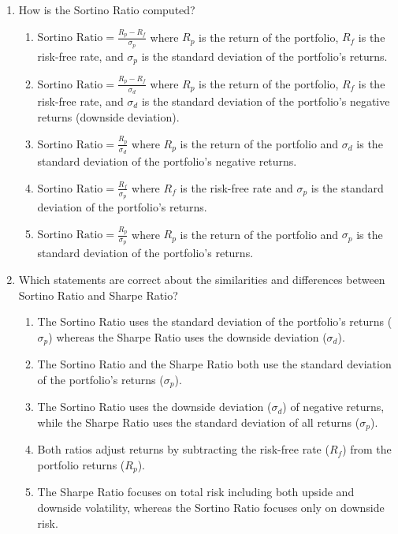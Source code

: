 \documentclass{article}
\begin{document}
\begin{enumerate}
    \item How is the Sortino Ratio computed?
    \begin{enumerate}
        \item \(\text{Sortino Ratio} = \frac{R_p - R_f}{\sigma_p}\) where \(R_p\) is the return of the portfolio, \(R_f\) is the risk-free rate, and \(\sigma_p\) is the standard deviation of the portfolio's returns.
        \item \(\text{Sortino Ratio} = \frac{R_p - R_f}{\sigma_d}\) where \(R_p\) is the return of the portfolio, \(R_f\) is the risk-free rate, and \(\sigma_d\) is the standard deviation of the portfolio's negative returns (downside deviation).
        \item \(\text{Sortino Ratio} = \frac{R_p}{\sigma_d}\) where \(R_p\) is the return of the portfolio and \(\sigma_d\) is the standard deviation of the portfolio's negative returns.
        \item \(\text{Sortino Ratio} = \frac{R_f}{\sigma_p}\) where \(R_f\) is the risk-free rate and \(\sigma_p\) is the standard deviation of the portfolio's returns.
        \item \(\text{Sortino Ratio} = \frac{R_p}{\sigma_p}\) where \(R_p\) is the return of the portfolio and \(\sigma_p\) is the standard deviation of the portfolio's returns.
    \end{enumerate}

    \item Which statements are correct about the similarities and differences between Sortino Ratio and Sharpe Ratio?
    \begin{enumerate}
        \item The Sortino Ratio uses the standard deviation of the portfolio's returns (\(\sigma_p\)) whereas the Sharpe Ratio uses the downside deviation (\(\sigma_d\)).
        \item The Sortino Ratio and the Sharpe Ratio both use the standard deviation of the portfolio's returns (\(\sigma_p\)).
        \item The Sortino Ratio uses the downside deviation (\(\sigma_d\)) of negative returns, while the Sharpe Ratio uses the standard deviation of all returns (\(\sigma_p\)).
        \item Both ratios adjust returns by subtracting the risk-free rate (\(R_f\)) from the portfolio returns (\(R_p\)).
        \item The Sharpe Ratio focuses on total risk including both upside and downside volatility, whereas the Sortino Ratio focuses only on downside risk.
    \end{enumerate}


\end{enumerate}
\end{document}
